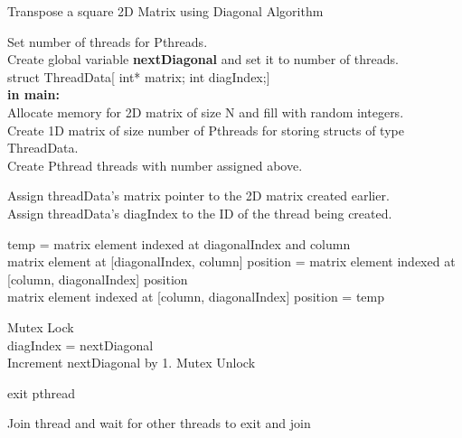 \documentclass[10pt, onecolumn]{article}
\begin{document}
\begin{algorithm}[H]
    \label{Alg:PthreadDiagonalTrans}
    \caption{Transpose a square 2D Matrix using Diagonal Algorithm}
    Set number of threads for Pthreads.\\
    Create global variable \textbf{nextDiagonal} and set it to number of threads. \\
    struct ThreadData[ int* matrix; int diagIndex;] \\
    
    \textbf{in main:} \\
    Allocate memory for 2D matrix of size N and fill with random integers. \\
    Create 1D matrix of size number of Pthreads for storing structs of type ThreadData. \\
    Create Pthread threads with number assigned above.\\
    
    {   
        Assign threadData's matrix pointer to the 2D matrix created earlier.\\
        Assign threadData's diagIndex to the ID of the thread being created.\\
        {
            {
                temp = matrix element indexed at diagonalIndex and column \\
                matrix element at [diagonalIndex, column] position = matrix element indexed at [column,  diagonalIndex] position \\
                matrix element indexed at [column, diagonalIndex] position = temp
            }
            
            Mutex Lock\\
            {
                diagIndex = nextDiagonal\\
                Increment nextDiagonal by 1.
                }
            Mutex Unlock\\
            
        }
        exit pthread
    }
    
    {
        Join thread and wait for other threads to exit and join
    }
\end{algorithm}
%
\clearpage
\end{document}
